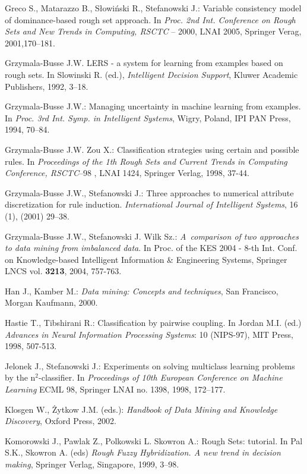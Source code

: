 \documentclass{llncs}
\begin{document}
\begin{thebibliography}{17}
Greco S., Matarazzo B., S{\l}owi\'nski R., Stefanowski J.: Variable
consistency model of dominance-based rough set approach. In {\em Proc. 2nd
Int. Conference on Rough Sets and New Trends in Computing, RSCTC} -- 2000,
LNAI 2005, Springer Verag, 2001,170--181.


  Grzymala-Busse J.W.  LERS - a system for learning from
examples based on rough sets. In Slowinski R. (ed.), {\em Intelligent
Decision Support}, Kluwer Academic Publishers, 1992, 3--18.

 Grzymala-Busse J.W.: Managing uncertainty in machine
learning from examples. In {\em Proc. 3rd Int. Symp. in Intelligent
Systems}, Wigry, Poland, IPI PAN Press, 1994, 70--84.


 Grzymala-Busse J.W. Zou X.:
Classification strategies using certain and possible rules. In {\em
Proceedings of the 1th Rough Sets and Current Trends in Computing
Conference, RSCTC}--98 , LNAI 1424, Springer Verlag, 1998, 37-44.


 Grzymala-Busse J.W., Stefanowski J.:
Three approaches to numerical attribute discretization for rule induction.
{\em International Journal of Intelligent Systems}, 16 (1), (2001) 29--38.

 Grzymala-Busse J.W., Stefanowski J. Wilk Sz.:
\emph{A~comparison of two approaches to data mining from imbalanced data}.
In Proc. of the KES 2004 - 8-th Int. Conf. on Knowledge-based Intelligent
Information \& Engineering Systems,  Springer LNCS vol. \textbf{3213}, 2004,
757-763.

Han J., Kamber M.: {\em Data mining: Concepts and techniques}, San
Francisco, Morgan Kaufmann, 2000.


  Hastie T., Tibshirani R.: Classification by pairwise
coupling. In Jordan M.I. (ed.) {\em Advances in Neural Information
Processing Systems}: 10 (NIPS-97), MIT Press, 1998, 507-513.

  Jelonek J., Stefanowski J.: Experiments on solving
multiclass learning problems by the n$^2$-classifier. In {\em Proceedings of
10th European Conference on Machine Learning} ECML 98, Springer LNAI no.
1398, 1998, 172--177.


 Klosgen W., \.Zytkow J.M. (eds.): {\em Handbook of Data Mining and Knowledge
Discovery}, Oxford Press, 2002.


  Komorowski J., Pawlak Z., Polkowski L. Skowron
A.: Rough Sets: tutorial. In Pal S.K., Skowron A. (eds) {\em Rough Fuzzy
Hybridization. A new trend in decision making}, Springer Verlag, Singapore,
1999, 3--98.



\end{thebibliography}
\end{document}
